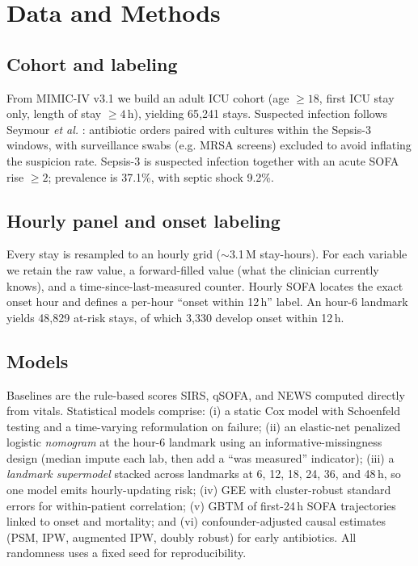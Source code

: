 \documentclass[conference]{IEEEtran}
\begin{document}
\section{Data and Methods}
\label{sec:methods}

\subsection{Cohort and labeling}
From MIMIC-IV v3.1 we build an adult ICU cohort (age $\ge 18$, first ICU stay
only, length of stay $\ge 4$\,h), yielding 65{,}241 stays. Suspected infection
follows Seymour \emph{et al.} \cite{seymour2016criteria}: antibiotic orders
paired with cultures within the Sepsis-3 windows, with surveillance swabs (e.g.
MRSA screens) excluded to avoid inflating the suspicion rate. Sepsis-3 is
suspected infection together with an acute SOFA rise $\ge 2$; prevalence is
37.1\%, with septic shock 9.2\%.

\subsection{Hourly panel and onset labeling}
Every stay is resampled to an hourly grid ($\sim$3.1\,M stay-hours). For each
variable we retain the raw value, a forward-filled value (what the clinician
currently knows), and a time-since-last-measured counter. Hourly SOFA locates
the exact onset hour and defines a per-hour ``onset within 12\,h'' label. An
hour-6 landmark yields 48{,}829 at-risk stays, of which 3{,}330 develop onset
within 12\,h.

\subsection{Models}
Baselines are the rule-based scores SIRS, qSOFA, and NEWS computed directly
from vitals. Statistical models comprise: (i) a static Cox model with Schoenfeld
testing and a time-varying reformulation on failure; (ii) an elastic-net
penalized logistic \emph{nomogram} at the hour-6 landmark using an
informative-missingness design (median impute each lab, then add a ``was
measured'' indicator); (iii) a \emph{landmark supermodel} stacked across
landmarks at 6, 12, 18, 24, 36, and 48\,h, so one model emits hourly-updating
risk; (iv) GEE with cluster-robust standard errors for within-patient
correlation; (v) GBTM of first-24\,h SOFA trajectories linked to onset and
mortality; and (vi) confounder-adjusted causal estimates (PSM, IPW, augmented
IPW, doubly robust) for early antibiotics. All randomness uses a fixed seed for
reproducibility.
\end{document}
